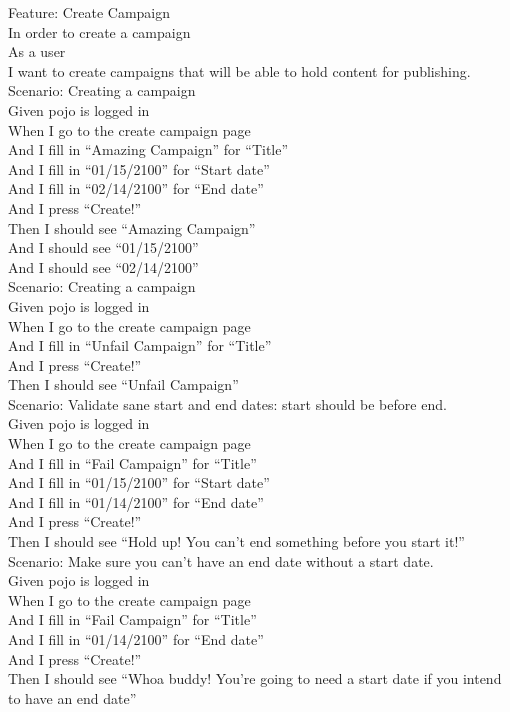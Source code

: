 \documentclass[12pt]{article}
\begin{document}
\begin{hangparas}{0.25in}{1}
Feature: Create Campaign \\
In order to create a campaign \\
As a user \\
I want to create campaigns that will be able to hold content for publishing. \\

Scenario: Creating a campaign \\
Given pojo is logged in \\
When I go to the create campaign page \\
And I fill in ``Amazing Campaign'' for ``Title'' \\
And I fill in ``01/15/2100'' for ``Start date'' \\
And I fill in ``02/14/2100'' for ``End date''   \\
And I press ``Create!'' \\
Then I should see ``Amazing Campaign'' \\
And I should see ``01/15/2100'' \\
And I should see ``02/14/2100'' \\

Scenario: Creating a campaign \\
Given pojo is logged in \\
When I go to the create campaign page \\
And I fill in ``Unfail Campaign'' for ``Title'' \\
And I press ``Create!'' \\
Then I should see ``Unfail Campaign'' \\

Scenario: Validate sane start and end dates: start should be before end. \\
Given pojo is logged in \\
When I go to the create campaign page \\
And I fill in ``Fail Campaign'' for ``Title'' \\
And I fill in ``01/15/2100'' for ``Start date'' \\
And I fill in ``01/14/2100'' for ``End date'' \\
And I press ``Create!'' \\
Then I should see ``Hold up! You can't end something before you start it!'' \\

Scenario: Make sure you can't have an end date without a start date. \\
Given pojo is logged in \\
When I go to the create campaign page \\
And I fill in ``Fail Campaign'' for ``Title'' \\
And I fill in ``01/14/2100'' for ``End date'' \\
And I press ``Create!'' \\
Then I should see ``Whoa buddy! You're going to need a start date if you intend to have an end date'' \\
\end{hangparas}
\end{document}
